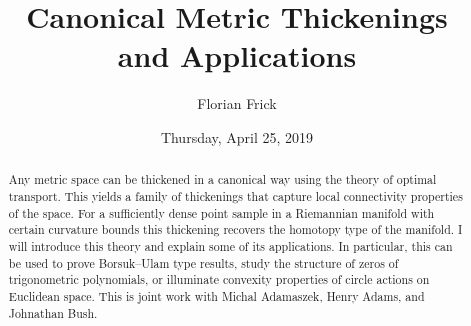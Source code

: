 \documentclass{UAmathtalk}
\author{Florian Frick}
\title{Canonical Metric Thickenings\\ and Applications}
\date{Thursday, April 25, 2019}
\begin{document}
\maketitle

\begin{abstract}
Any metric space can be thickened in a canonical way using the theory of optimal transport. This yields a family of thickenings that capture local connectivity properties of the space. For a sufficiently dense point sample in a Riemannian manifold with certain curvature bounds this thickening recovers the homotopy type of the manifold. I will introduce this theory and explain some of its applications. In particular, this can be used to prove Borsuk--Ulam type results, study the structure of zeros of trigonometric polynomials, or illuminate convexity properties of circle actions on Euclidean space.
This is joint work with Michal Adamaszek, Henry Adams, and Johnathan Bush.
\end{abstract}
\end{document}
